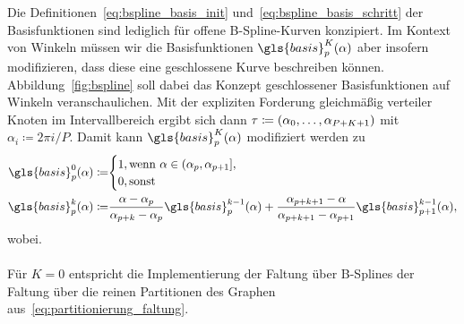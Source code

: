 Die Definitionen~\eqref{eq:bspline_basis_init} und~\eqref{eq:bspline_basis_schritt} der Basisfunktionen sind lediglich für offene B-Spline-Kurven konzipiert.
Im Kontext von Winkeln müssen wir die Basisfunktionen $\gls{basis}_p^K\left(\alpha\right)$ aber insofern modifizieren, dass diese eine geschlossene Kurve beschreiben können.
Abbildung~\ref{fig:bspline} soll dabei das Konzept geschlossener Basisfunktionen auf Winkeln veranschaulichen.
Mit der expliziten Forderung gleichmäßig verteiler Knoten im Intervallbereich ergibt sich dann $\ve{\tau} \coloneqq \left(\alpha_0, \ldots, \alpha_{P+K+1}\right)$ mit $\alpha_i \coloneqq 2\pi i / P$.
Damit kann $\gls{basis}_p^K\left(\alpha\right)$ modifiziert werden zu
\begin{align}
  \gls{basis}_p^0\left(\alpha\right) \coloneqq & \begin{cases}
    1, \text{wenn } \alpha \in \left(\alpha_p, \alpha_{p+1}\right],\\
    0, \text{sonst}
  \end{cases}\\
  \gls{basis}_p^k\left(\alpha\right) \coloneqq & \frac{\alpha - \alpha_p}{\alpha_{p+k} - \alpha_p} \gls{basis}_p^{k-1}\left(\alpha\right) + \frac{\alpha_{p+k+1} - \alpha}{\alpha_{p+k+1} - \alpha_{p+1}}\gls{basis}_{p+1}^{k-1}\left(\alpha\right),
\end{align}
wobei.
\\\\
Für $K=0$ entspricht die Implementierung der Faltung über B-Splines der Faltung über die reinen Partitionen des Graphen aus~\eqref{eq:partitionierung_faltung}.













